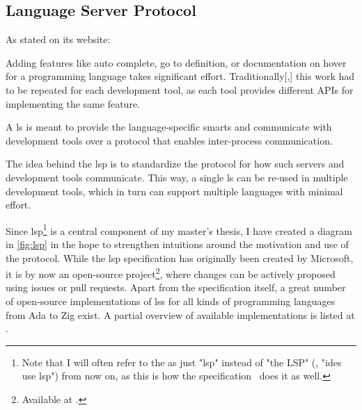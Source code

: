 \documentclass[../thesis]{subfiles}
\begin{document}
\subsection{Language Server Protocol}\label{subsec:lsp}

As stated on its website:
\begin{displayquote}
	Adding features like auto complete, go to definition, or documentation on hover for a programming language takes significant effort. Traditionally[,] this work had to be repeated for each development tool, as each tool provides different APIs for implementing the same feature.

	A \gls*{ls} is meant to provide the language-specific smarts and communicate with development tools over a protocol that enables inter-process communication.

	The idea behind the \gls*{lsp} is to standardize the protocol for how such servers and development tools communicate. This way, a single \gls{ls} can be re-used in multiple development tools, which in turn can support multiple languages with minimal effort.
\end{displayquote}

\noindent{}Since \gls{lsp}\footnote{%
	Note that I will often refer to the  as just "\gls{lsp}" instead of "the LSP" (\eg, "\glspl{ide} use \gls{lsp}") from now on, as this is how the specification~\cite{lsp} does it as well.
} is a central component of my master's thesis, I have created a diagram in \cref{fig:lsp} in the hope to strengthen intuitions around the motivation and use of the protocol.
While the \gls{lsp} specification has originally been created by Microsoft, it is by now an open-source project\footnote{
	Available at .
}, where changes can be actively proposed using issues or pull requests.
Apart from the specification itself, a great number of open-source implementations of \glspl{ls} for all kinds of programming languages from Ada to Zig exist.
A partial overview of available implementations is listed at .
\end{document}
